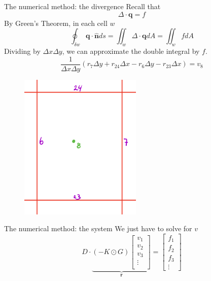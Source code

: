 \documentclass{beamer}
\begin{document}
    \begin{frame}{The numerical method: the divergence}
        Recall that
        \begin{equation*}
            \Delta \cdot \bm{q} = f
        \end{equation*}
        By Green's Theorem, in each cell $w$
        \begin{equation*}
            \oint_{\delta w} \bm{q} \cdot \hat{\bm{n}} ds = \iint_w \Delta \cdot \bm{q} dA = \iint_w f dA
        \end{equation*}
        Dividing by $\Delta x \Delta y$, we can approximate the double integral by $f$.
        \begin{equation*}
            \frac{1}{\Delta x \Delta y} (r_7 \Delta y + r_{24} \Delta x - r_6 \Delta y - r_{23}\Delta x) = v_8
        \end{equation*}
        \begin{figure}
            \includegraphics[scale=0.24]{cell.png}
        \end{figure}
    \end{frame}

    \begin{frame}{The numerical method: the system}
        We just have to solve for $v$
        \begin{equation*}
            D \cdot \underbrace{(-K \odot G) 
            \begin{bmatrix}
                v_1 \\
                v_2 \\
                v_3 \\
                \vdots \\
            \end{bmatrix}}_{\bm{r}}
            = 
            \begin{bmatrix}
                f_1 \\
                f_2 \\
                f_3 \\
                \vdots
            \end{bmatrix}
        \end{equation*}
    \end{frame}
\end{document}
